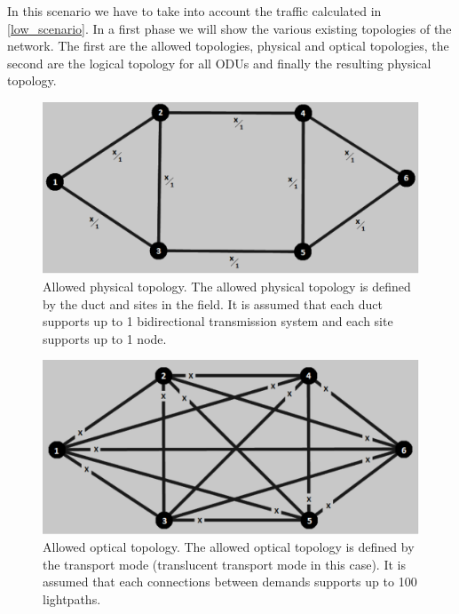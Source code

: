 In this scenario we have to take into account the traffic calculated in \ref{low_scenario}. In a first phase we will show the various existing topologies of the network. The first are the allowed topologies, physical and optical topologies, the second are the logical topology for all ODUs and finally the resulting physical topology.\\

\begin{figure}[H]
\centering
\includegraphics[width=13cm]{sdf/heuristic/translucent_survivability/figures/allowed_physical}
\caption{Allowed physical topology. The allowed physical topology is defined by the duct and sites in the field. It is assumed that each duct supports up to 1 bidirectional transmission system and each site supports up to 1 node.}
\label{allowed_physical_surv_ref_low_heuristic_translucent}
\end{figure}

\begin{figure}[H]
\centering
\includegraphics[width=13cm]{sdf/heuristic/translucent_survivability/figures/allowed_optical}
\caption{Allowed optical topology. The allowed optical topology is defined by the transport mode (translucent transport mode in this case). It is assumed that each connections between demands supports up to 100 lightpaths.}
\label{allowed_optical_surv_ref_low_heuristic_translucent}
\end{figure}

